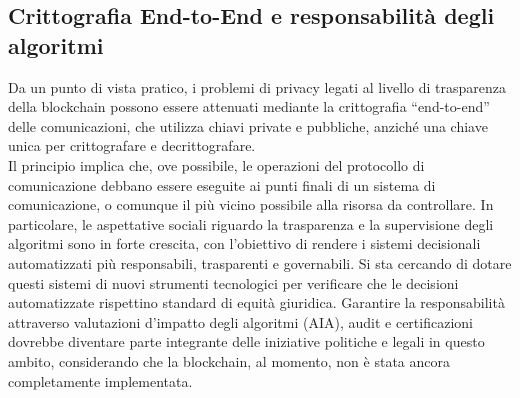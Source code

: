 \subsection{Crittografia End-to-End e responsabilità degli algoritmi}
Da un punto di vista pratico, i problemi di privacy legati al livello di trasparenza della blockchain possono essere attenuati mediante la crittografia “end-to-end” delle comunicazioni, che utilizza chiavi private e pubbliche, anziché una chiave unica per crittografare e decrittografare.
\\Il principio implica che, ove possibile, le operazioni del protocollo di comunicazione debbano essere eseguite ai punti finali di un sistema di comunicazione, o comunque il più vicino possibile alla risorsa da controllare.
In particolare, le aspettative sociali riguardo la trasparenza e la supervisione degli algoritmi sono in forte crescita, con l’obiettivo di rendere i sistemi decisionali automatizzati più responsabili, trasparenti e governabili. Si sta cercando di dotare questi sistemi di nuovi strumenti tecnologici per verificare che le decisioni automatizzate rispettino standard di equità giuridica. 
Garantire la responsabilità attraverso valutazioni d’impatto degli algoritmi (AIA), audit e certificazioni dovrebbe diventare parte integrante delle iniziative politiche e legali in questo ambito, considerando che la blockchain, al momento, non è stata ancora completamente implementata.
\\
\\
\\
